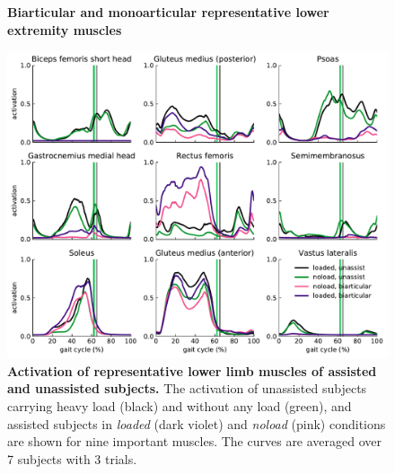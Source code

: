 \documentclass[10pt,letterpaper]{article}
\begin{document}
\begin{figure}[ht!]
	\centering
	\hfil
	\vspace{1mm}
	\caption{\small{\textbf{Biarticular and monoarticular representative lower extremity muscles}}}
	\label{Fig_Muscles}
\end{figure}
\begin{figure}[ht]   
	\centering
	\includegraphics[width=\linewidth]{Ideal_Exo_MonovsBi_Figures/PaperFigure_Biarticular_MuscleActivation.pdf}
	\vspace{1mm}
	\caption{{\small\textbf{Activation of representative lower limb muscles of assisted and unassisted subjects.} The activation of unassisted subjects carrying heavy load (black) and without any load (green), and assisted subjects in \textit{loaded} (dark violet) and \textit{noload} (pink) conditions are shown for nine important muscles. The curves are averaged over 7 subjects with 3 trials.}}
	\label{Fig_IdealExo_MusclesActivation}
\end{figure}
\end{document}
